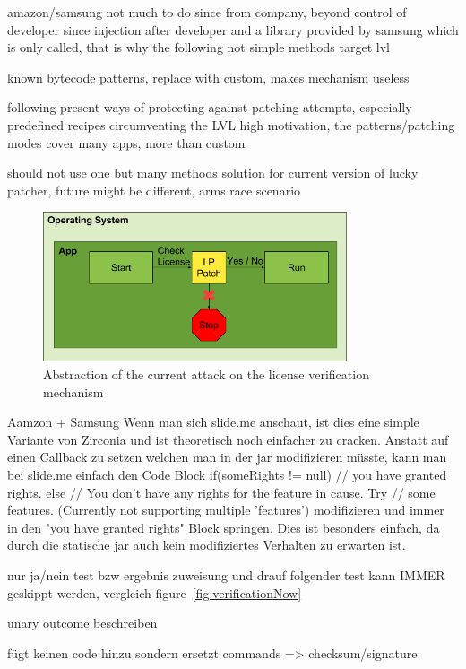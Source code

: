 amazon/samsung not much to do since from company, beyond control of developer since injection after developer and a library provided by samsung which is only called, that is why the following not simple methods target lvl

known bytecode patterns, replace with custom, makes mechanism useless

following present ways of protecting against patching attempts, especially predefined recipes circumventing the LVL
high motivation, the patterns/patching modes cover many apps, more than custom

should not use one but many methods
solution for current version of lucky patcher, future might be different, arms race scenario
\cite{munteanLicense}
%

\begin{figure}[h]
    \centering
    \includegraphics[width=0.8\textwidth]{data/verificationNowAttack.png}
    \caption{Abstraction of the current attack on the license verification mechanism}
    \label{fig:verificationNowAttack}
\end{figure}


Aamzon + Samsung
Wenn man sich slide.me anschaut, ist dies eine simple Variante von Zirconia und ist theoretisch noch einfacher zu cracken. Anstatt auf einen Callback zu setzen welchen man in der jar modifizieren müsste, kann man bei slide.me einfach den Code Block
 if(someRights != null){
        // you have granted rights.
    } else {
        // You don't have any rights for the feature in cause. Try
        // some features. (Currently not supporting multiple 'features')
    }
modifizieren und immer in den "you have granted rights" Block springen. Dies ist besonders einfach, da durch die statische jar auch kein modifiziertes Verhalten zu erwarten ist.


nur ja/nein test bzw ergebnis zuweisung und drauf folgender test kann IMMER geskippt werden, vergleich figure~\ref{fig:verificationNow}

unary outcome beschreiben

fügt keinen code hinzu sondern ersetzt commands => checksum/signature
